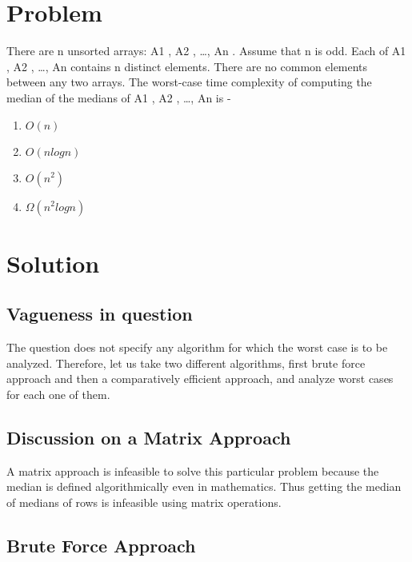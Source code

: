 \documentclass[journal,12pt,twocolumn]{IEEEtran}
\begin{document}
\section{Problem}
There are n unsorted arrays: A1 , A2 , …, An . Assume that n is odd. Each of A1 , A2 , …, An
contains n distinct elements. There are no common elements between any two arrays. The
worst-case time complexity of computing the median of the medians of A1 , A2 , …, An is -

\begin{enumerate}
    \item $O(n)$
    \item $O(nlogn)$
    \item  $O(n^{2})$
    \item $\Omega(n^{2}log n)$
\end{enumerate}



\section{Solution}
\subsection{Vagueness in question}
The question does not specify any algorithm for which the worst case is to be analyzed. Therefore, let us take two different algorithms, first brute force approach and then a comparatively efficient approach, and analyze worst cases for each one of them.

\subsection{Discussion on a Matrix Approach}
A matrix approach is infeasible to solve this particular problem because the median is defined algorithmically even in mathematics. Thus getting the median of medians of rows is infeasible using matrix operations.

\subsection{Brute Force Approach}
\end{document}
